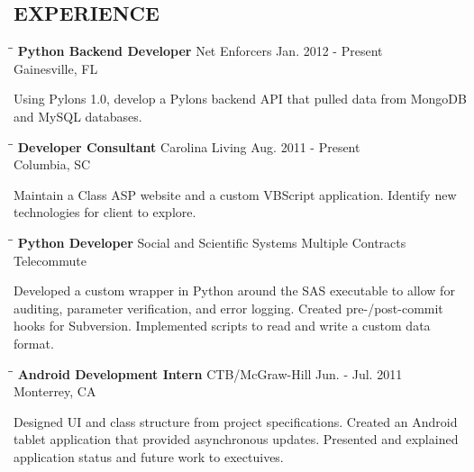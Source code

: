 \documentclass{res}
\begin{document}
\begin{resume}
\section{EXPERIENCE}
   \vspace{-0.1in}	
   \begin{tabbing}
   \hspace{2.3in}\= \hspace{2.6in}\= \kill %
    {\bf Python Backend Developer} \>Net Enforcers     \>Jan. 2012 - Present\\
                             \>Gainesville, FL
   \end{tabbing}\vspace{-20pt}      %
   Using Pylons 1.0, develop a Pylons backend API that pulled data from MongoDB and MySQL databases.

   \begin{tabbing}
   \hspace{2.3in}\= \hspace{2.6in}\= \kill %
    {\bf Developer Consultant} \>Carolina Living \>Aug. 2011 - Present\\
                          \>Columbia, SC
   \end{tabbing}\vspace{-20pt}
    Maintain a Class ASP website and a custom VBScript application.  Identify new
    technologies for client to explore.

   \begin{tabbing}%
   \hspace{2.3in}\= \hspace{2.6in}\= \kill %
   {\bf Python Developer}  \>Social and Scientific Systems \> Multiple Contracts\\
                          \>Telecommute
   \end{tabbing}\vspace{-20pt}
    Developed a custom wrapper in Python around the SAS executable to allow for 
    auditing, parameter verification, and error logging.  Created pre-/post-commit hooks
    for Subversion.  Implemented scripts to read and write a custom data format.
    
    \begin{tabbing}%
   \hspace{2.3in}\= \hspace{2.6in}\= \kill %
   {\bf Android Development Intern}  \>CTB/McGraw-Hill \> Jun. - Jul. 2011\\
                          \>Monterrey, CA
   \end{tabbing}\vspace{-20pt}
    Designed UI and class structure from project specifications.  Created an Android 
    tablet application that provided asynchronous updates.  Presented and explained
    application status and future work to exectuives.


\end{resume}
\end{document}

